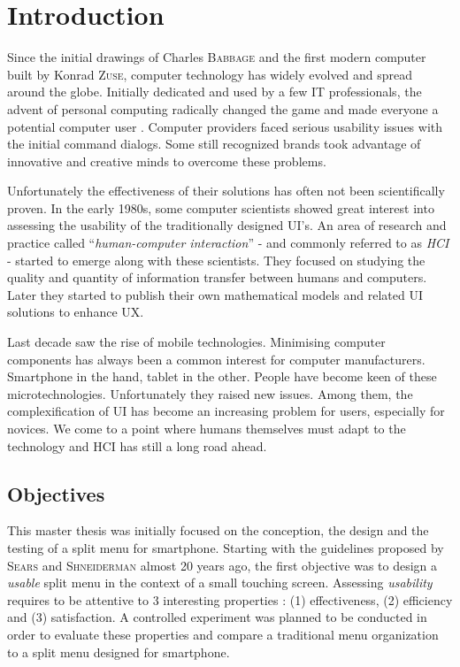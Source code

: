 \chapter{Introduction}
Since the initial drawings of Charles \textsc{Babbage} and the first modern 
computer 
built by Konrad \textsc{Zuse}, computer technology has widely evolved and 
spread around 
the globe. Initially dedicated and used by a few IT professionals, 
the advent of personal computing radically changed the game and made everyone a 
potential computer user \cite{hci}. Computer providers faced serious usability 
issues with the initial command dialogs. Some still recognized brands took 
advantage of innovative and creative minds to overcome these problems.\newline

Unfortunately the effectiveness of their solutions has often not been 
scientifically proven. In the early 1980s, some computer scientists showed 
great 
interest into assessing the usability of the traditionally designed UI's. An 
area of research and practice called \enquote{\textit{human-computer 
interaction}} - and 
commonly referred to as \textit{HCI} - started to emerge along with these 
scientists. They focused on studying the quality and quantity of information 
transfer between humans and computers. Later they started to publish their own 
mathematical models and related UI solutions to enhance UX.\newline

Last decade saw the rise of mobile technologies. Minimising computer components 
has always been a common interest for computer manufacturers. Smartphone in the 
hand, tablet in the other. People have become keen of these microtechnologies. 
Unfortunately they raised new issues. Among them, the complexification of UI has 
become an increasing problem for users, especially for novices. We come to a 
point where humans themselves must adapt to the technology and HCI has still a 
long road ahead.

\section{Objectives}
This master thesis was initially focused on the conception, the design and the 
testing of a split menu for smartphone. Starting with the guidelines proposed 
by \textsc{Sears} and \textsc{Shneiderman} \cite{sears} almost 20 years ago, the 
first objective 
was to design a \textit{usable} split menu in the context of a small 
touching screen. Assessing \textit{usability} requires to be attentive to 3 
interesting properties : (1) effectiveness, (2) efficiency and (3) 
satisfaction. A controlled experiment was planned to be conducted in order to 
evaluate these properties and compare a traditional menu organization to a 
split menu designed for smartphone. \newline

